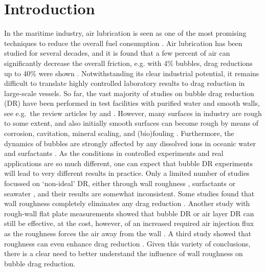 \documentclass{jfm}
\begin{document}
\section{Introduction}
In the maritime industry, air lubrication is seen as one of the most promising techniques to reduce the overall fuel consumption \citep{kod00,Foeth2008,Makiharju2012}. Air lubrication has been studied for several decades, and it is found that a few percent of air can significantly decrease the overall friction, e.g. with 4\% bubbles, drag reductions up to 40\% were shown \citep{gil13, ver16}.  Notwithstanding its clear industrial potential, it remains difficult to translate highly controlled laboratory results to drag reduction  in large-scale vessels. So far, the vast majority of studies on bubble drag reduction (DR) have been performed in test facilities with purified water and smooth walls, see e.g.\ the review articles by \citet{cec10} and \citet{murai2014}.
However, many surfaces in industry are rough to some extent, and also initially smooth surfaces can become rough by means of corrosion, cavitation, mineral scaling, and (bio)fouling \citep{sch07,Schultz2011}. Furthermore, the dynamics of bubbles are strongly affected by any dissolved ions in oceanic water and surfactants \citep{takagi2008,takagi2011}. 
As the conditions in controlled experiments and real applications are so much different, one can expect that bubble DR experiments will lead to very different results in practice. 
Only a limited number of studies focussed on `non-ideal' DR, either through  wall roughness \citep{deu04,ber07,elbing2008,elbing2013}, surfactants or seawater \citep{Takahashi2001,Winkel2004,Shen2006,elbing2008,ver16}, and their results are somewhat inconsistent. Some studies found that wall roughness completely eliminates any drag reduction \citep{ber07}. Another study with rough-wall flat plate measurements showed that bubble DR or air layer DR can still be effective, at the cost, however, of an increased required air injection flux as the roughness forces the air away from the wall \citep{elbing2013}. A third study showed that roughness can even enhance drag reduction \citep{deu04}. Given this variety of conclusions, there is a clear need to better understand the influence of wall roughness on bubble drag reduction.



 
\end{document}
